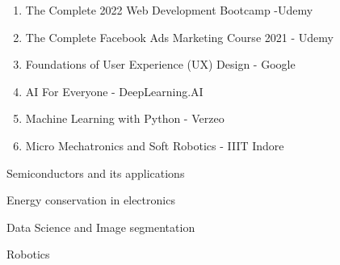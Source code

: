\documentclass[11pt, a4paper]{russell}
\begin{document}

\begin{cventries}
\begin{enumerate}
    \item The Complete 2022 Web Development Bootcamp -Udemy
    \item The Complete Facebook Ads Marketing Course 2021 - Udemy
    \item Foundations of User Experience (UX) Design - Google
    \item AI For Everyone - DeepLearning.AI
    \item Machine Learning with Python - Verzeo
    \item Micro Mechatronics and Soft Robotics - IIIT Indore
\end{enumerate}
\end{cventries}


\begin{cventries}
\begin{cvitems}
\item \smallCreating Semiconductors and its applications
\item \small Energy conservation in electronics
\item \small Data Science and Image segmentation
\item \small Robotics
\end{cvitems}
\end{cventries}

\end{document}
